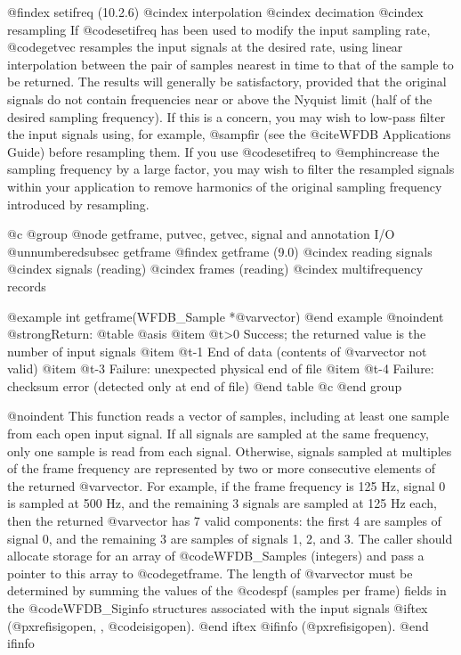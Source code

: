 {{{{{{{{{@findex setifreq (10.2.6)
@cindex interpolation
@cindex decimation
@cindex resampling
If @code{setifreq} has been used to modify the input sampling rate,
@code{getvec} resamples the input signals at the desired rate, using
linear interpolation between the pair of samples nearest in time to that
of the sample to be returned.  The results will generally be
satisfactory, provided that the original signals do not contain
frequencies near or above the Nyquist limit (half of the desired
sampling frequency).  If this is a concern, you may wish to low-pass
filter the input signals using, for example, @samp{fir} (see the
@cite{WFDB Applications Guide}) before resampling them.  If you use
@code{setifreq} to @emph{increase} the sampling frequency by a large
factor, you may wish to filter the resampled signals within your
application to remove harmonics of the original sampling frequency
introduced by resampling.

@c @group
@node    getframe, putvec, getvec, signal and annotation I/O
@unnumberedsubsec getframe
@findex getframe (9.0)
@cindex reading signals
@cindex signals (reading)
@cindex frames (reading)
@cindex multifrequency records

@example
int getframe(WFDB_Sample *@var{vector})
@end example
@noindent
@strong{Return:}
@table @asis
@item @t{>0}
Success;  the returned value is the number of input signals
@item @t{-1}
End of data (contents of @var{vector} not valid)
@item @t{-3}
Failure: unexpected physical end of file
@item @t{-4}
Failure: checksum error (detected only at end of file)
@end table
@c @end group

@noindent
This function reads a vector of samples, including at least one sample from
each open input signal.  If all signals are sampled at the same frequency, only
one sample is read from each signal.  Otherwise, signals sampled at multiples
of the frame frequency are represented by two or more consecutive elements of
the returned @var{vector}.  For example, if the frame frequency is 125 Hz,
signal 0 is sampled at 500 Hz, and the remaining 3 signals are sampled at 125
Hz each, then the returned @var{vector} has 7 valid components: the first 4 are
samples of signal 0, and the remaining 3 are samples of signals 1, 2, and 3.
The caller should allocate storage for an array of @code{WFDB_Sample}s
(integers) and pass a pointer to this array to @code{getframe}.  The length of
@var{vector} must be determined by summing the values of the @code{spf}
(samples per frame) fields in the @code{WFDB_Siginfo} structures associated
with the input signals
@iftex
(@pxref{isigopen, , @code{isigopen}}).
@end iftex
@ifinfo
(@pxref{isigopen}).
@end ifinfo

}}}}}}}}}
